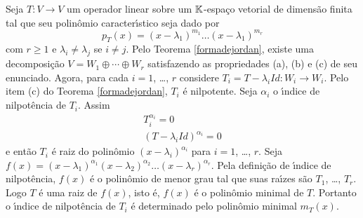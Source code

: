 Seja $T : V \to V$ um operador linear sobre um $\mathbb{K}$-espa\c{c}o vetorial de dimens\~ao finita tal que seu polin\^omio caracter{\'\i}stico seja dado por
\[
	p_T(x) = (x - \lambda_1)^{m_1}\dots(x - \lambda_1)^{m_r}
\]
com $r \ge 1$ e $\lambda_i \ne \lambda_j$ se $i \ne j$. Pelo Teorema \ref{formadejordan}, existe uma decomposi\c{c}\~ao $V = W_1 \oplus \cdots \oplus W_r$ satisfazendo as propriedades (a), (b) e (c) de seu enunciado. Agora, para cada $i = 1$, \dots, $r$ considere $T_i = T - \lambda_i Id : W_i \to W_i$. Pelo item (c) do Teorema \ref{formadejordan}, $T_i$ \'e nilpotente. Seja $\alpha_i$ o {\'\i}ndice de nilpot\^encia de $T_i$. Assim
\begin{align*}
	T_i^{\alpha_i} = 0\\
	(T - \lambda_i Id)^{\alpha_i} = 0
\end{align*}
e ent\~ao $T_i$ \'e raiz do polin\^omio $(x - \lambda_i)^{\alpha_i}$ para $i = 1$, \dots, $r$. Seja $f(x) = (x - \lambda_1)^{\alpha_1} (x - \lambda_2)^{\alpha_2}\dots (x - \lambda_r)^{\alpha_r}$. Pela defini\c{c}\~ao de {\'\i}ndice de nilpot\^encia, $f(x)$ \'e o polin\^omio de menor grau tal que suas ra{\'\i}zes s\~ao $T_1$, \dots, $T_r$. Logo $T$ \'e uma raiz de $f(x)$, isto \'e, $f(x)$ \'e o polin\^omio minimal de $T$. Portanto o {\'\i}ndice de nilpot\^encia de $T_i$ \'e determinado pelo polin\^omio minimal $m_T(x)$.


